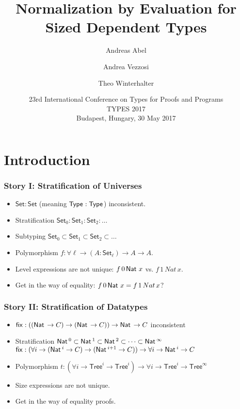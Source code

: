 \documentclass[t]{beamer}
\title[NbE for Sized Dependent Types]{%
  Normalization by Evaluation for Sized Dependent Types}
\author[Abel Vezzosi Winterhalter]{
  Andreas Abel\inst{1}
  \and Andrea Vezzosi\inst{1}
  \and Theo Winterhalter\inst{2}
}
\institute[] %
{
  \inst{1}
  Department of Computer Science and Engineering\\
  Chalmers and Gothenburg University, Sweden \\[1ex]

  \inst{2}
  École Normale Supérieure de Cachan, France \\
}
\date[TYPES'17] %
{ 23rd International Conference on
  Types for Proofs and Programs \\
  TYPES 2017 \\
  Budapest, Hungary, 30 May 2017
}
\renewcommand{\Set}{\mathsf{Set}}
\newcommand{\Tree}{\mathsf{Tree}}
\begin{document}
\maketitle



%

\section{Introduction}


\begin{frame}%
  \frametitle{Story I: Stratification of Universes}
  \begin{itemize}
  \item $\Set : \Set$ (meaning $\mathsf{Type}_{} : \mathsf{Type}_{}$) inconsistent.
  \item Stratification $\Set_0 : \Set_1 : \Set_2 : \dots$
  \item Subtyping $\Set_0 \subset \Set_1 \subset \Set_2 \subset \dots$
  \item Polymorphism $f : \forall \ell \to (A : \Set_\ell) \to A \to A$.
  \item Level expressions are not unique: $f\,0\,\mathsf{Nat}\,\,x$ vs. $f\,1\,Nat\,x$.
  \item Get in the way of equality: $f\,0\,\mathsf{Nat}\,\,x = f\,1\,Nat\,x$?
  \end{itemize}
\end{frame}

\begin{frame}%
  \frametitle{Story II: Stratification of Datatypes}
  \begin{itemize}
  \item $\mathsf{fix} : ((\mathsf{Nat}\, \to C) \to (\mathsf{Nat}\, \to C)) \to \mathsf{Nat}\, \to C$
    inconsistent
  \item Stratification $\mathsf{Nat}\,^0 \subset \mathsf{Nat}\,^1 \subset \mathsf{Nat}\,^2 \subset \dots \subset \mathsf{Nat}\,^\infty$ \\
    $\mathsf{fix} : (\forall i \to (\mathsf{Nat}\,^i \to C) \to (\mathsf{Nat}\,^{i+1} \to C))
    \to \forall i \to \mathsf{Nat}\,^i \to C$
  \item Polymorphism $t : (\forall i \to \Tree^i \to \Tree^i) \to
    \forall i \to \Tree^i \to \Tree^\infty$
  \item Size expressions are not unique.
  \item Get in the way of equality proofs.
  \end{itemize}
\end{frame}
\end{document}
